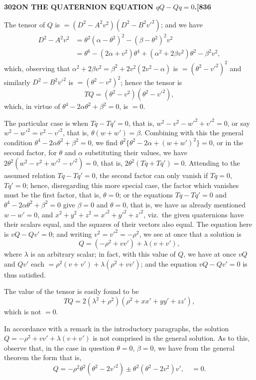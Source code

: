 \documentclass[11pt,a4paper]{book}
\begin{document}
\newpage
\setcounter{page}{302}

\noindent\textbf{302}\hfill\textbf{ON THE QUATERNION EQUATION $qQ - Qq = 0$.}\hfill\textbf{[836}

\bigskip

\noindent The tensor of $Q$ is $= (D^2 - A^2v^2)(D^2 - B^2v'^2)$; and we have
\begin{align*}
D^2 - A^2v^2 &= \theta^2(\alpha - \theta^2)^2 - (\beta - \theta^2)^2 v^2 \\
&= \theta^6 - (2\alpha + v^2)\theta^4 + (\alpha^2 + 2\beta v^2)\theta^2 - \beta^2 v^2,
\end{align*}
which, observing that $\alpha^2 + 2\beta v^2 = \beta^2 + 2v^2(2v^2 - \alpha)$ is $= (\theta^2 - v'^2)^2$ and similarly $D^2 - B^2v'^2$ is $= (\theta^2 - v^2)^2$; hence the tensor is
\[
TQ = (\theta^2 - v^2)(\theta^2 - v'^2),
\]
which, in virtue of $\theta^4 - 2\alpha\theta^2 + \beta^2 = 0$, is $= 0$.

The particular case is when $Tq - Tq' = 0$, that is, $w^2 - v^2 - w'^2 + v'^2 = 0$, or say $w^2 - w'^2 = v^2 - v'^2$, that is, $\theta(w + w') = \beta$. Combining with this the general condition $\theta^4 - 2\alpha\theta^2 + \beta^2 = 0$, we find $\theta^2\{\theta^2 - 2\alpha + (w + w')^2\} = 0$, or in the second factor, for $\theta$ and $\alpha$ substituting their values, we have $2\theta^2(w^2 - v^2 + w'^2 - v'^2) = 0$, that is, $2\theta^2(Tq + Tq') = 0$. Attending to the assumed relation $Tq - Tq' = 0$, the second factor can only vanish if $Tq = 0$, $Tq' = 0$; hence, disregarding this more special case, the factor which vanishes must be the first factor, that is, $\theta = 0$; or the equations $Tq - Tq' = 0$ and $\theta^4 - 2\alpha\theta^2 + \beta^2 = 0$ give $\beta = 0$ and $\theta = 0$, that is, we have as already mentioned $w - w' = 0$, and $x^2 + y^2 + z^2 = x'^2 + y'^2 + z'^2$, viz.\ the given quaternions have their scalars equal, and the squares of their vectors also equal. The equation here is $vQ - Qv' = 0$; and writing $v^2 = v'^2 = -\rho^2$, we see at once that a solution is
\[
Q = (-\rho^2 + vv') + \lambda(v + v'),
\]
where $\lambda$ is an arbitrary scalar; in fact, with this value of $Q$, we have at once $vQ$ and $Qv'$ each $= \rho^2(v + v') + \lambda(\rho^2 + vv')$; and the equation $vQ - Qv' = 0$ is thus satisfied.

The value of the tensor is easily found to be
\[
TQ = 2(\lambda^2 + \rho^2)(\rho^2 + xx' + yy' + zz'),
\]
which is not $= 0$.

In accordance with a remark in the introductory paragraphs, the solution $Q = -\rho^2 + vv' + \lambda(v + v')$ is not comprised in the general solution. As to this, observe that, in the case in question $\theta = 0$, $\beta = 0$, we have from the general theorem the form that is,
\[
Q = -\rho^2 \theta^2 (\theta^2 - 2v'^2) \pm \theta^2 (\theta^2 - 2v^2)v', \quad = 0.
\]
\end{document}
